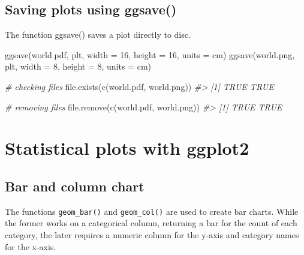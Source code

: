 \documentclass[
]{book}
\newenvironment{Shaded}{\begin{snugshade}}{\end{snugshade}}
\newcommand{\AttributeTok}[1]{\textcolor[rgb]{0.77,0.63,0.00}{#1}}
\newcommand{\CommentTok}[1]{\textcolor[rgb]{0.56,0.35,0.01}{\textit{#1}}}
\newcommand{\DecValTok}[1]{\textcolor[rgb]{0.00,0.00,0.81}{#1}}
\newcommand{\FunctionTok}[1]{\textcolor[rgb]{0.00,0.00,0.00}{#1}}
\newcommand{\NormalTok}[1]{#1}
\newcommand{\StringTok}[1]{\textcolor[rgb]{0.31,0.60,0.02}{#1}}
\begin{document}
\hypertarget{saving-plots-using-ggsave}{%
\subsection{Saving plots using ggsave()}\label{saving-plots-using-ggsave}}

The function ggsave() saves a plot directly to disc.

\begin{Shaded}
\begin{Highlighting}[]
\FunctionTok{ggsave}\NormalTok{(}\StringTok{\textquotesingle{}world.pdf\textquotesingle{}}\NormalTok{, plt, }\AttributeTok{width =} \DecValTok{16}\NormalTok{, }\AttributeTok{height =} \DecValTok{16}\NormalTok{, }\AttributeTok{units =} \StringTok{\textquotesingle{}cm\textquotesingle{}}\NormalTok{)}
\FunctionTok{ggsave}\NormalTok{(}\StringTok{\textquotesingle{}world.png\textquotesingle{}}\NormalTok{, plt, }\AttributeTok{width =} \DecValTok{8}\NormalTok{, }\AttributeTok{height =} \DecValTok{8}\NormalTok{, }\AttributeTok{units =} \StringTok{\textquotesingle{}cm\textquotesingle{}}\NormalTok{)}

\CommentTok{\# checking files}
\FunctionTok{file.exists}\NormalTok{(}\FunctionTok{c}\NormalTok{(}\StringTok{\textquotesingle{}world.pdf\textquotesingle{}}\NormalTok{, }\StringTok{\textquotesingle{}world.png\textquotesingle{}}\NormalTok{))}
\CommentTok{\#\textgreater{} [1] TRUE TRUE}

\CommentTok{\# removing files}
\FunctionTok{file.remove}\NormalTok{(}\FunctionTok{c}\NormalTok{(}\StringTok{\textquotesingle{}world.pdf\textquotesingle{}}\NormalTok{, }\StringTok{\textquotesingle{}world.png\textquotesingle{}}\NormalTok{))}
\CommentTok{\#\textgreater{} [1] TRUE TRUE}
\end{Highlighting}
\end{Shaded}

\hypertarget{statistical-plots-with-ggplot2}{%
\section{Statistical plots with ggplot2}\label{statistical-plots-with-ggplot2}}

\hypertarget{bar-and-column-chart}{%
\subsection{Bar and column chart}\label{bar-and-column-chart}}

The functions \texttt{geom\_bar()} and \texttt{geom\_col()} are used to create bar charts. While the former works on a categorical column, returning a bar for the count of each category, the later requires a numeric column for the y-axis and category names for the x-axis.
\end{document}
